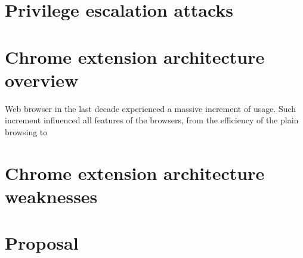 \section{Privilege escalation attacks}
\label{sec:Escalation}

\section{Chrome extension architecture overview}
\label{sec:ExtOverview}
Web browser in the last decade experienced a massive increment of usage. Such increment influenced all features of the browsers, from the efficiency of the plain browsing to 

\section{Chrome extension architecture weaknesses}
\label{sec:ExtWeakness}

\section{Proposal}
\label{sec:Proposal}